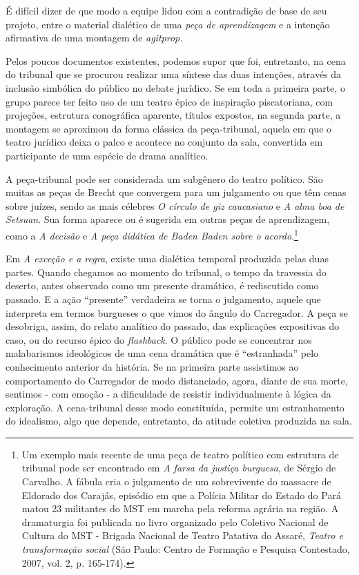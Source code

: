 É difícil dizer de que modo a equipe lidou com a contradição de base de
seu projeto, entre o material dialético de uma \textit{peça de
aprendizagem} e a intenção afirmativa de uma montagem de \textit{agitprop.}

Pelos poucos documentos existentes, podemos supor que foi, entretanto,
na cena do tribunal que se procurou realizar uma síntese das duas
intenções, através da inclusão simbólica do público no debate jurídico.
Se em toda a primeira parte, o grupo parece ter feito uso de um teatro
épico de inspiração piscatoriana, com projeções, estrutura conográfica
aparente, títulos expostos, na segunda parte, a montagem se aproximou da
forma clássica da peça-tribunal, aquela em que o teatro jurídico deixa o
palco e acontece no conjunto da sala, convertida em participante de uma
espécie de drama analítico.

A peça-tribunal pode ser considerada um subgênero do teatro político.
São muitas as peças de Brecht que convergem para um julgamento ou que
têm cenas sobre juízes, sendo as mais célebres \textit{O círculo de giz
caucasiano} e \textit{A alma boa de Setsuan}. Sua forma aparece ou é
sugerida em outras peças de aprendizagem, como a \textit{A decisão} e
\textit{A peça didática de Baden Baden sobre o acordo}.\footnote{Um exemplo
  mais recente de uma peça de teatro político com estrutura de tribunal
  pode ser encontrado em \textit{A farsa da justiça burguesa}, de Sérgio de
  Carvalho. A fábula cria o julgamento de um sobrevivente do massacre de
  Eldorado dos Carajás, episódio em que a Polícia Militar do Estado do
  Pará matou 23 militantes do MST em marcha pela reforma agrária na
  região. A dramaturgia foi publicada no livro organizado pelo Coletivo
  Nacional de Cultura do MST - Brigada Nacional de Teatro Patativa do
  Assaré, \textit{Teatro e transformação social} (São Paulo: Centro de
  Formação e Pesquisa Contestado, 2007, vol. 2, p. 165-174).}

Em \textit{A exceção e a regra}, existe uma dialética temporal produzida
pelas duas partes. Quando chegamos ao momento do tribunal, o tempo da
travessia do deserto, antes observado como um presente dramático, é
rediscutido como passado. E a ação “presente” verdadeira se torna o
julgamento, aquele que interpreta em termos burgueses o que vimos do
ângulo do Carregador. A peça se desobriga, assim, do relato analítico do
passado, das explicações expositivas do caso, ou do recurso épico do
\textit{flashback}. O público pode se concentrar nos malabarismos
ideológicos de uma cena dramática que é “estranhada” pelo conhecimento
anterior da história. Se na primeira parte assistimos ao comportamento
do Carregador de modo distanciado, agora, diante de sua morte, sentimos
- com emoção - a dificuldade de resistir individualmente à lógica da
exploração. A cena-tribunal desse modo constituída, permite um
estranhamento do idealismo, algo que depende, entretanto, da atitude
coletiva produzida na sala.

